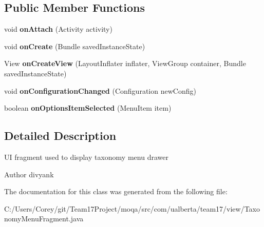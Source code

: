 \subsection*{Public Member Functions}
\begin{DoxyCompactItemize}
\item 
\hypertarget{classcom_1_1ualberta_1_1team17_1_1view_1_1_taxonomy_menu_fragment_ac82530a736a145b98f71436c7870ad3b}{void {\bfseries on\+Attach} (Activity activity)}\label{classcom_1_1ualberta_1_1team17_1_1view_1_1_taxonomy_menu_fragment_ac82530a736a145b98f71436c7870ad3b}

\item 
\hypertarget{classcom_1_1ualberta_1_1team17_1_1view_1_1_taxonomy_menu_fragment_ac26ff7c7d20ed3630e12d23effeabb9c}{void {\bfseries on\+Create} (Bundle saved\+Instance\+State)}\label{classcom_1_1ualberta_1_1team17_1_1view_1_1_taxonomy_menu_fragment_ac26ff7c7d20ed3630e12d23effeabb9c}

\item 
\hypertarget{classcom_1_1ualberta_1_1team17_1_1view_1_1_taxonomy_menu_fragment_a1addc8787780c009601950134c89cab4}{View {\bfseries on\+Create\+View} (Layout\+Inflater inflater, View\+Group container, Bundle saved\+Instance\+State)}\label{classcom_1_1ualberta_1_1team17_1_1view_1_1_taxonomy_menu_fragment_a1addc8787780c009601950134c89cab4}

\item 
\hypertarget{classcom_1_1ualberta_1_1team17_1_1view_1_1_taxonomy_menu_fragment_a38437144fb746835b8890026d1adec4b}{void {\bfseries on\+Configuration\+Changed} (Configuration new\+Config)}\label{classcom_1_1ualberta_1_1team17_1_1view_1_1_taxonomy_menu_fragment_a38437144fb746835b8890026d1adec4b}

\item 
\hypertarget{classcom_1_1ualberta_1_1team17_1_1view_1_1_taxonomy_menu_fragment_ae1dfa0d1ea376a4fff40f4fc7e789202}{boolean {\bfseries on\+Options\+Item\+Selected} (Menu\+Item item)}\label{classcom_1_1ualberta_1_1team17_1_1view_1_1_taxonomy_menu_fragment_ae1dfa0d1ea376a4fff40f4fc7e789202}

\end{DoxyCompactItemize}


\subsection{Detailed Description}
U\+I fragment used to display taxonomy menu drawer

\begin{DoxyAuthor}{Author}
divyank 
\end{DoxyAuthor}


The documentation for this class was generated from the following file\+:\begin{DoxyCompactItemize}
\item 
C\+:/\+Users/\+Corey/git/\+Team17\+Project/moqa/src/com/ualberta/team17/view/Taxonomy\+Menu\+Fragment.\+java\end{DoxyCompactItemize}
